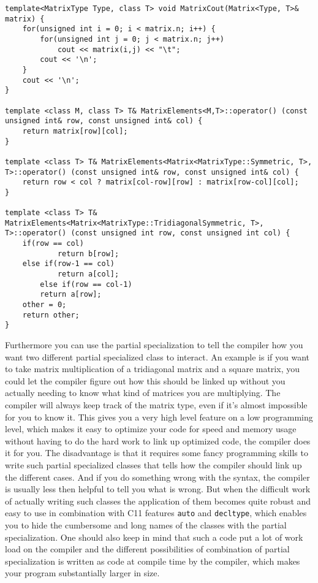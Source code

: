 \documentclass[11pt,english,a4paper]{article}
\begin{document}
\begin{flushleft}
\begin{lstlisting}[title={Printing a matrix}]
template<MatrixType Type, class T> void MatrixCout(Matrix<Type, T>& matrix) {
    for(unsigned int i = 0; i < matrix.n; i++) {
        for(unsigned int j = 0; j < matrix.n; j++)
            cout << matrix(i,j) << "\t";
        cout << '\n';
    }
    cout << '\n';
}

template <class M, class T> T& MatrixElements<M,T>::operator() (const unsigned int& row, const unsigned int& col) { 
	return matrix[row][col];
}

template <class T> T& MatrixElements<Matrix<MatrixType::Symmetric, T>, T>::operator() (const unsigned int& row, const unsigned int& col) {
	return row < col ? matrix[col-row][row] : matrix[row-col][col];
}

template <class T> T& MatrixElements<Matrix<MatrixType::TridiagonalSymmetric, T>, T>::operator() (const unsigned int row, const unsigned int col) {    
   	if(row == col)
    		return b[row];
   	else if(row-1 == col)
    		return a[col];
    	else if(row == col-1)
		return a[row];
	other = 0;
	return other;
}
\end{lstlisting}

Furthermore you can use the partial specialization to tell the compiler how you want two different partial specialized class to interact. An example is if you want to take matrix multiplication of a tridiagonal matrix and a square matrix, you could let the compiler figure out how this should be linked up without you actually needing to know what kind of matrices you are multiplying. The compiler will always keep track of the matrix type, even if it's almost impossible for you to know it. This gives you a very high level feature on a low programming level, which makes it easy to optimize your code for speed and memory usage without having to do the hard work to link up optimized code, the compiler does it for you. The disadvantage is that it requires some fancy programming skills to write such partial specialized classes that tells how the compiler should link up the different cases. And if you do something wrong with the syntax, the compiler is usually less then helpful to tell you what is wrong. But when the difficult work of actually writing such classes the application of them becomes quite robust and easy to use in combination with C11 features \texttt{auto} and \texttt{decltype}, which enables you to hide the cumbersome and long names of the classes with the partial specialization. One should also keep in mind that such a code put a lot of work load on the compiler and the different possibilities of combination of partial specialization is written as code at compile time by the compiler, which makes your program substantially larger in size. \linebreak


\end{flushleft}
\end{document}
